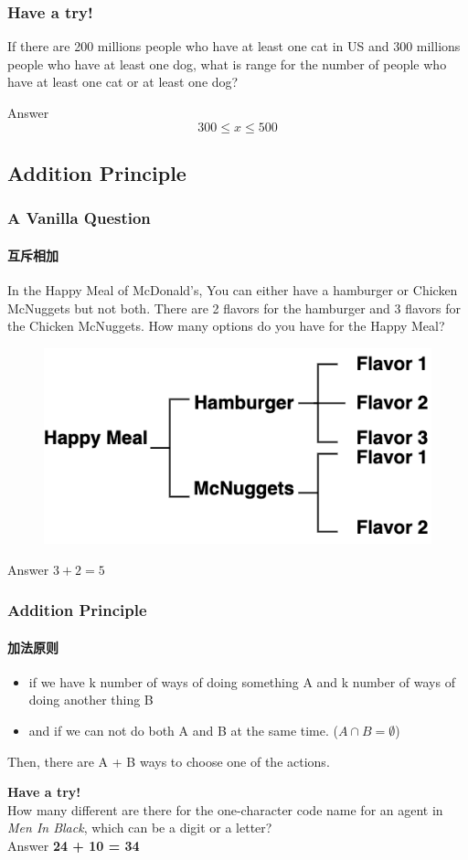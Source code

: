 \documentclass[
	11pt, %
]{beamer}
\begin{document}


\begin{frame}
	\frametitle{Have a try!}
If there are 200 millions people who have at least one cat in US and 300 millions people who have at least one dog, what is range for the number of people who have at least one cat \alert{or} at least one dog?


\pause
\bigskip\bigskip\bigskip\bigskip
Answer \textbf{$$300 \leq x \leq 500$$}
\end{frame}



\subsection{Addition Principle}


\begin{frame}
	\frametitle{A Vanilla Question} %
	\framesubtitle{互斥相加}
			In the Happy Meal of McDonald's, You can either have a hamburger or Chicken McNuggets but not both. There are 2 flavors for the hamburger and 3 flavors for the Chicken McNuggets. How many options do you have for the Happy Meal?\\
			\pause
			\begin{figure}
				\includegraphics[width=0.5\linewidth]{Addition_Vanilla.png}
			\end{figure}
			\bigskip
			\pause
			Answer \textbf{$3 + 2 = 5$}
\end{frame}



\begin{frame}
	\frametitle{Addition Principle} %
	\framesubtitle{加法原则}
	\begin{definition}
		\begin{itemize}
      \item if we have k number of ways of doing something A and k number of ways of doing another thing B
      \item and if \alert{we can not do both A and B at the same time}. ($A \cap B = \emptyset$)
		\end{itemize}
				Then, there are A + B ways to choose one of the actions.
	\end{definition}
	\textbf{Have a try!}\\
	 How many different are there for the one-character code name for an agent in \emph{Men In Black}, which can be a digit or a letter?\\ \pause
	 Answer \textbf{24 +  10 = 34}
	
\end{frame}
\end{document}
